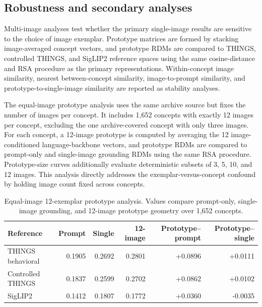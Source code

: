 \documentclass{article}
\begin{document}
\subsection{Robustness and secondary analyses}

Multi-image analyses test whether the primary single-image results are sensitive to the choice of image exemplar. Prototype matrices are formed by stacking image-averaged concept vectors, and prototype RDMs are compared to THINGS, controlled THINGS, and SigLIP2 reference spaces using the same cosine-distance and RSA procedure as the primary representations. Within-concept image similarity, nearest between-concept similarity, image-to-prompt similarity, and prototype-to-single-image similarity are reported as stability analyses.

The equal-image prototype analysis uses the same archive source but fixes the number of images per concept. It includes 1,652 concepts with exactly 12 images per concept, excluding the one archive-covered concept with only three images. For each concept, a 12-image prototype is computed by averaging the 12 image-conditioned language-backbone vectors, and prototype RDMs are compared to prompt-only and single-image grounding RDMs using the same RSA procedure. Prototype-size curves additionally evaluate deterministic subsets of 3, 5, 10, and 12 images. This analysis directly addresses the exemplar-versus-concept confound by holding image count fixed across concepts.

\begin{table}[!htbp]
\centering
\caption{Equal-image 12-exemplar prototype analysis. Values compare prompt-only, single-image grounding, and 12-image prototype geometry over 1,652 concepts.}
\label{tab:twelve_image_prototype}
\small
\begin{tabular}{lrrrrr}
  \toprule
  Reference & Prompt & Single & 12-image & Prototype--prompt & Prototype--single \\
  \midrule
  THINGS behavioral & 0.1905 & 0.2692 & 0.2801 & +0.0896 & +0.0111 \\
  Controlled THINGS & 0.1837 & 0.2599 & 0.2702 & +0.0862 & +0.0102 \\
  SigLIP2 & 0.1412 & 0.1807 & 0.1772 & +0.0360 & -0.0035 \\
  \bottomrule
\end{tabular}
\end{table}
\end{document}
